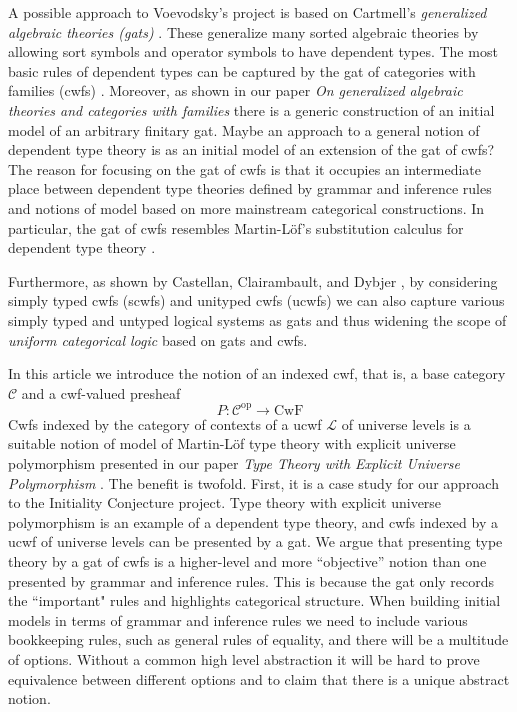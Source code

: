 \documentclass[11pt,a4paper]{article}
\theoremstyle{plain}
\theoremstyle{definition}
\newcommand{\op}{\mathrm{op}}
\def\L{{\mathcal{L}}}
\def\CwF{\mathrm{CwF}}
\def\C{\mathcal{C}}
\begin{document}
A possible approach to Voevodsky's project is based on Cartmell's {\em generalized algebraic theories (gats)} \cite{cartmell:phd,cartmell:apal}. These generalize many sorted algebraic theories by allowing sort symbols and operator symbols to have dependent types. The most basic rules of dependent types can be captured by the gat of categories with families (cwfs) \cite{dybjer:torino}. Moreover, as shown in our paper {\em On generalized algebraic theories and categories with families} \cite{bezem:hofmann} there is a generic construction of an initial model of an arbitrary finitary gat. 
Maybe an approach to a general notion of dependent type theory is as an initial model of an extension of the gat of cwfs? The reason for focusing on the gat of cwfs is that it occupies an intermediate place between dependent type theories defined by grammar and inference rules and notions of model based on more mainstream categorical constructions. In particular, the gat of cwfs resembles Martin-Löf's substitution calculus for dependent type theory \cite{martinlof:gbg92,tasistro:lic}.

Furthermore, as shown by Castellan, Clairambault, and Dybjer \cite{castellan:lambek}, by considering simply typed cwfs (scwfs) and unityped cwfs (ucwfs) we can also capture various simply typed and untyped logical systems as gats and thus widening the scope of {\em uniform categorical logic} based on gats and cwfs.

In this article we introduce the notion of an indexed cwf, that is, a base category $\C$ and a cwf-valued presheaf
$$
P : \C^\op \to \CwF
$$
Cwfs indexed by the category of contexts of a ucwf $\L$ of universe levels is a suitable notion of model of Martin-Löf type theory with explicit universe polymorphism presented in our paper {\em Type Theory with Explicit Universe Polymorphism} \cite{BezemCDE22}. The benefit is twofold. First, it is a case study for our approach to the Initiality Conjecture project. Type theory with explicit universe polymorphism is an example of a dependent type theory, and cwfs indexed by a ucwf of universe levels can be presented by a gat. We argue that presenting type theory by a gat of cwfs is a higher-level and more ``objective'' notion than one presented by grammar and inference rules. This is because the gat only records the ``important" rules and highlights categorical structure. When building initial models in terms of grammar and inference rules we need to include various bookkeeping rules, such as general rules of equality, and there will be a multitude of options. Without a common high level abstraction it will be hard to prove equivalence between different options and to claim that there is a unique abstract notion. 
\end{document}
